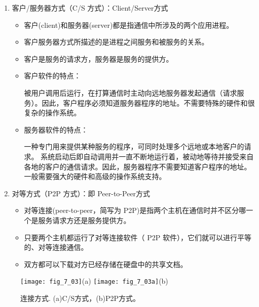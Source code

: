 \begin{enumerate}
  \item 客户/服务器方式（C/S 方式）：Client/Server方式
  \begin{itemize}
    \item 客户(client)和服务器(server)都是指通信中所涉及的两个应用进程。

\item 客户服务器方式所描述的是进程之间服务和被服务的关系。

\item 客户是服务的请求方，服务器是服务的提供方。

\item 客户软件的特点：

被用户调用后运行，在打算通信时主动向远地服务器发起通信（请求服务）。因此，客户程序必须知道服务器程序的地址。不需要特殊的硬件和很复杂的操作系统。

\item 服务器软件的特点：

一种专门用来提供某种服务的程序，可同时处理多个远地或本地客户的请求。
系统启动后即自动调用并一直不断地运行着，被动地等待并接受来自各地的客户的通信请求。因此，服务器程序不需要知道客户程序的地址。
一般需要强大的硬件和高级的操作系统支持。



  \end{itemize}
  \item 对等方式（P2P 方式）：即 Peer-to-Peer方式


  \begin{itemize}
    \item 对等连接(peer-to-peer，简写为 P2P)是指两个主机在通信时并不区分哪一个是服务请求方还是服务提供方。

\item 只要两个主机都运行了对等连接软件（ P2P 软件），它们就可以进行平等的、对等连接通信。
\item 双方都可以下载对方已经存储在硬盘中的共享文档。

  \end{itemize}
\end{enumerate}



\begin{figure}
  \centering
  \texttt{[image: fig\_7\_03]}(a)
  \texttt{[image: fig\_7\_03a]}(b)\\
  \caption{连接方式. (a)C/S方式，(b)P2P方式。}\label{fig_7_03}
\end{figure}


